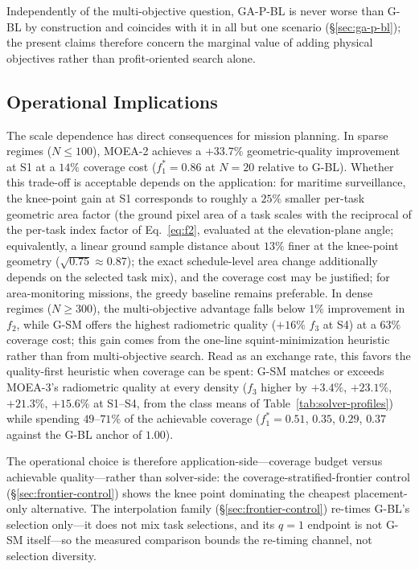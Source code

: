 \documentclass[preprint,12pt,authoryear]{elsarticle}
\begin{document}
Independently of the multi-objective question, GA-P-BL is never worse than
G-BL by construction and coincides with it in all but one scenario
(\S\ref{sec:ga-p-bl}); the present claims therefore concern the marginal
value of adding physical objectives rather than profit-oriented search alone.

\subsection{Operational Implications}
\label{sec:operational-implications}

The scale dependence has direct consequences for mission planning.
In sparse regimes ($N \leq 100$), MOEA-2 achieves a $+33.7\%$ geometric-quality
improvement at S1 at a $14\%$ coverage cost ($f_1^* = 0.86$
at $N=20$ relative to G-BL). Whether this trade-off is acceptable
depends on the application: for maritime surveillance, the
knee-point gain at S1 corresponds to roughly a $25\%$ smaller
per-task geometric area factor (the ground pixel area of a task scales with
the reciprocal of the per-task index factor of Eq.~\ref{eq:f2}, evaluated at
the elevation-plane angle; equivalently, a linear ground sample distance
about $13\%$ finer at the knee-point geometry ($\sqrt{0.75} \approx 0.87$);
the exact schedule-level area change additionally
depends on the selected task mix), and the coverage cost may be
justified; for area-monitoring missions, the greedy baseline remains
preferable. In dense regimes ($N \geq 300$), the multi-objective
advantage falls below $1\%$ improvement in $f_2$, while G-SM offers
the highest radiometric quality ($+16\%$ $f_3$ at S4) at a $63\%$
coverage cost; this gain comes from the one-line squint-minimization
heuristic rather than from multi-objective search. Read as an exchange
rate, this favors the quality-first heuristic when coverage can be
spent: G-SM matches or exceeds MOEA-3's radiometric quality at every
density ($f_3$ higher by $+3.4\%$, $+23.1\%$, $+21.3\%$, $+15.6\%$ at
S1--S4, from the class means of Table~\ref{tab:solver-profiles}) while
spending $49$--$71\%$ of the achievable coverage ($f_1^* = 0.51$,
$0.35$, $0.29$, $0.37$ against the G-BL anchor of $1.00$).

The operational choice is therefore application-side---coverage budget
versus achievable quality---rather than solver-side: the
coverage-stratified-frontier control (\S\ref{sec:frontier-control})
shows the knee point dominating the cheapest placement-only alternative.
The interpolation family (\S\ref{sec:frontier-control}) re-times G-BL's
selection only---it does not mix task selections, and its $q=1$ endpoint
is not G-SM itself---so the measured comparison bounds the re-timing
channel, not selection diversity.
\end{document}
